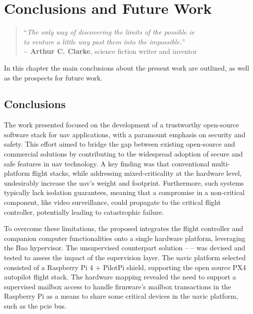 %
\chapter{Conclusions and Future Work}
\label{cha:concl}
%
\begin{quote}
\begin{flushright}
``\emph{The only way of discovering the limits of the possible is}\\
  \emph{to venture a little way past them into the impossible.}'' \\
\textbf{-- Arthur C. Clarke}, science fiction writer and inventor
\end{flushright}
\end{quote}

In this chapter the main conclusions about the present work are outlined, as
well as the prospects for future work.

\section{Conclusions}
The work presented focused on the development of a
trustworthy open-source software stack for \gls{uav} applications, with a paramount emphasis on security and safety. This effort aimed to bridge the gap between existing open-source and commercial solutions by contributing to the widespread adoption of secure and safe features in \gls{uav} technology.
A key finding was that conventional multi-platform flight stacks, while
addressing mixed-criticality at the hardware level, undesirably increase the
\gls{uav}'s weight and footprint. Furthermore, such systems typically lack isolation
guarantees, meaning that a compromise in a non-critical component, like video
surveillance, could propagate to the critical flight controller, potentially
leading to catastrophic failure.

To overcome these limitations, the proposed  integrates the flight controller and companion computer
functionalities onto a single hardware platform, leveraging the Bao
hypervisor. The unsupervised counterpart solution --  -- was devised and tested to
assess the impact of the supervision layer. The \gls{uavic} platform selected
consisted of a Raspberry Pi 4 + PilotPi shield, supporting the open source
PX4 autopilot flight stack. The hardware mapping revealed the need to support a
supervised mailbox access to handle firmware's mailbox transactions in the
Raspberry Pi as a means to share some critical devices in the \gls{uavic}
platform, such as the \gls{pcie} bus.

